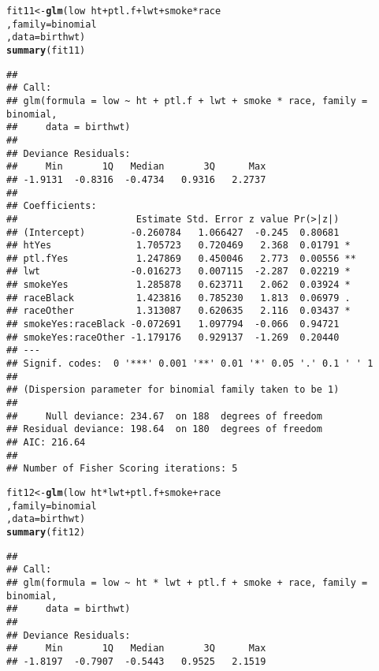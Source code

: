 \documentclass{article}\usepackage[]{graphicx}\usepackage[]{color}
\makeatletter
\newcommand{\hlopt}[1]{\textcolor[rgb]{0,0,0}{#1}}%
\newcommand{\hlstd}[1]{\textcolor[rgb]{0.345,0.345,0.345}{#1}}%
\newcommand{\hlkwb}[1]{\textcolor[rgb]{0.69,0.353,0.396}{#1}}%
\newcommand{\hlkwc}[1]{\textcolor[rgb]{0.333,0.667,0.333}{#1}}%
\newcommand{\hlkwd}[1]{\textcolor[rgb]{0.737,0.353,0.396}{\textbf{#1}}}%
\newenvironment{kframe}{%
 \def\at@end@of@kframe{}%
 \ifinner\ifhmode%
  \def\at@end@of@kframe{\end{minipage}}%
  \begin{minipage}{\columnwidth}%
 \fi\fi%
 \def\FrameCommand##1{\hskip\@totalleftmargin \hskip-\fboxsep
 \colorbox{shadecolor}{##1}\hskip-\fboxsep
     \hskip-\linewidth \hskip-\@totalleftmargin \hskip\columnwidth}%
 \MakeFramed {\advance\hsize-\width
   \@totalleftmargin\z@ \linewidth\hsize
   \@setminipage}}%
 {\par\unskip\endMakeFramed%
 \at@end@of@kframe}
\newenvironment{knitrout}{}{} %
\makeatother
\begin{document}
\begin{knitrout}
\color{fgcolor}\begin{kframe}
\begin{alltt}
\hlstd{fit11} \hlkwb{<-} \hlkwd{glm}\hlstd{(low} \hlopt{~} \hlstd{ht} \hlopt{+} \hlstd{ptl.f} \hlopt{+} \hlstd{lwt} \hlopt{+} \hlstd{smoke} \hlopt{*} \hlstd{race}
             \hlstd{,} \hlkwc{family} \hlstd{= binomial}
             \hlstd{,} \hlkwc{data} \hlstd{= birthwt)}
\hlkwd{summary}\hlstd{(fit11)}
\end{alltt}
\begin{verbatim}
## 
## Call:
## glm(formula = low ~ ht + ptl.f + lwt + smoke * race, family = binomial, 
##     data = birthwt)
## 
## Deviance Residuals: 
##     Min       1Q   Median       3Q      Max  
## -1.9131  -0.8316  -0.4734   0.9316   2.2737  
## 
## Coefficients:
##                     Estimate Std. Error z value Pr(>|z|)   
## (Intercept)        -0.260784   1.066427  -0.245  0.80681   
## htYes               1.705723   0.720469   2.368  0.01791 * 
## ptl.fYes            1.247869   0.450046   2.773  0.00556 **
## lwt                -0.016273   0.007115  -2.287  0.02219 * 
## smokeYes            1.285878   0.623711   2.062  0.03924 * 
## raceBlack           1.423816   0.785230   1.813  0.06979 . 
## raceOther           1.313087   0.620635   2.116  0.03437 * 
## smokeYes:raceBlack -0.072691   1.097794  -0.066  0.94721   
## smokeYes:raceOther -1.179176   0.929137  -1.269  0.20440   
## ---
## Signif. codes:  0 '***' 0.001 '**' 0.01 '*' 0.05 '.' 0.1 ' ' 1
## 
## (Dispersion parameter for binomial family taken to be 1)
## 
##     Null deviance: 234.67  on 188  degrees of freedom
## Residual deviance: 198.64  on 180  degrees of freedom
## AIC: 216.64
## 
## Number of Fisher Scoring iterations: 5
\end{verbatim}
\begin{alltt}
\hlstd{fit12} \hlkwb{<-} \hlkwd{glm}\hlstd{(low} \hlopt{~} \hlstd{ht} \hlopt{*} \hlstd{lwt} \hlopt{+} \hlstd{ptl.f}  \hlopt{+} \hlstd{smoke} \hlopt{+} \hlstd{race}
             \hlstd{,} \hlkwc{family} \hlstd{= binomial}
             \hlstd{,} \hlkwc{data} \hlstd{= birthwt)}
\hlkwd{summary}\hlstd{(fit12)}
\end{alltt}
\begin{verbatim}
## 
## Call:
## glm(formula = low ~ ht * lwt + ptl.f + smoke + race, family = binomial, 
##     data = birthwt)
## 
## Deviance Residuals: 
##     Min       1Q   Median       3Q      Max  
## -1.8197  -0.7907  -0.5443   0.9525   2.1519  

\end{verbatim}
\end{kframe}
\end{knitrout}
\end{document}
